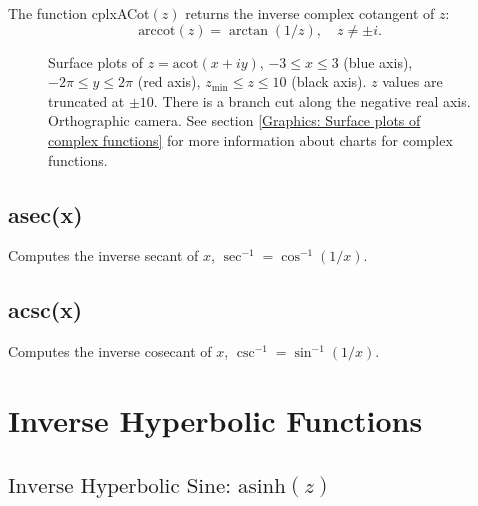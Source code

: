 \vspace{0.3cm}
The function \textsf{cplxACot$(z)$} returns the inverse complex cotangent of $z$: 
\begin{equation}
	\text{arccot}(z) = \arctan(1/z), \quad z \neq \pm i.
\end{equation}



\begin{figure}[ht]%
	\centering
	\qquad
	\caption[Complex Arccotangent]{Surface plots of $z = \text{acot}(x + iy)$, $-3 \leq x \leq 3$ (blue axis), $-2 \pi \leq y \leq 2\pi$ (red axis), $z_{\text{min}} \leq z \leq 10$ (black axis). $z$ values are truncated at $\pm 10$. There is a branch cut along the negative real axis. Orthographic camera. See section \ref{Graphics: Surface plots of complex functions} for more information about charts for complex functions.} 
	\label{fig:Complex Arccotangent}%
\end{figure}



\subsection{asec(x)}
Computes the inverse secant of $x$, $\sec^{-1} = \cos^{-1}(1/x)$.


\subsection{acsc(x)}
Computes the inverse cosecant of $x$, $\csc^{-1} = \sin^{-1}(1/x)$.


\newpage
\section{Inverse Hyperbolic Functions}
\label{InversehyperbolicFunctionsCplx}


\subsection{\texorpdfstring{$\text{Inverse Hyperbolic Sine: asinh}(z)$}{asinh}}
\label{inverse complex hyperbolic sine}

